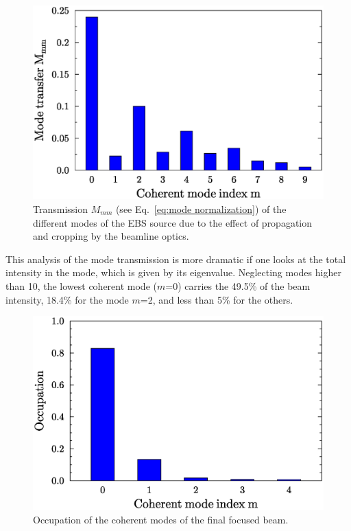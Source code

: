 \documentclass{iucr}              %
\begin{document}
\begin{figure}\label{fig:mode transmission}
    \centering
        \includegraphics[width=\textwidth]{GRAPHICS/propagated_modes.eps}
    \caption{Transmission $M_{mm}$ (see Eq.~\ref{eq:mode normalization}) of the different modes of the EBS source  due to the effect of propagation and cropping by the beamline optics.}
\end{figure}

This analysis of the mode transmission is more dramatic if one looks at the total intensity in the mode, which is given by its eigenvalue. Neglecting modes higher than 10, the lowest coherent mode ($m$=0) carries the 49.5\% of the beam intensity, 18.4\% for the mode $m$=2, and less than 5\% for the others. 


\begin{figure}\label{fig:rediagonalization}
    \centering
        \includegraphics[width=\textwidth]{GRAPHICS/rediagonalized_modes.eps}
    \caption{Occupation of the coherent modes of the final focused beam.}
\end{figure}
\end{document}
